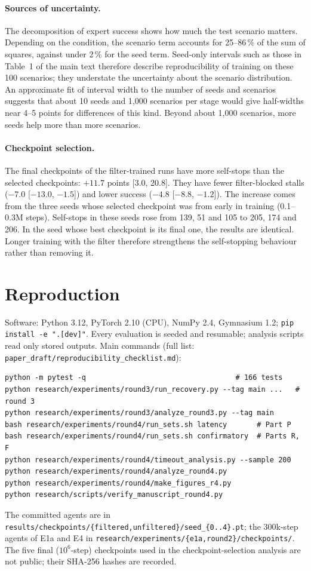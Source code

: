 \documentclass[11pt]{article}
\begin{document}
\paragraph{Sources of uncertainty.} The decomposition of expert success shows how much the test scenario matters. Depending on the condition, the scenario term accounts for 25--86\,\% of the sum of squares, against under 2\,\% for the seed term. Seed-only intervals such as those in Table~1 of the main text therefore describe reproducibility of training on these 100 scenarios; they understate the uncertainty about the scenario distribution. An approximate fit of interval width to the number of seeds and scenarios suggests that about 10 seeds and 1{,}000 scenarios per stage would give half-widths near 4--5 points for differences of this kind. Beyond about 1{,}000 scenarios, more seeds help more than more scenarios.

\paragraph{Checkpoint selection.} The final checkpoints of the filter-trained runs have more self-stops than the selected checkpoints: $+11.7$ points [3.0, 20.8]. They have fewer filter-blocked stalls ($-7.0$ [$-13.0$, $-1.5$]) and lower success ($-4.8$ [$-8.8$, $-1.2$]). The increase comes from the three seeds whose selected checkpoint was from early in training (0.1--0.3M steps). Self-stops in these seeds rose from 139, 51 and 105 to 205, 174 and 206. In the seed whose best checkpoint is its final one, the results are identical. Longer training with the filter therefore strengthens the self-stopping behaviour rather than removing it.

\section{Reproduction}
Software: Python 3.12, PyTorch 2.10 (CPU), NumPy 2.4, Gymnasium 1.2; \texttt{pip install -e ".[dev]"}. Every evaluation is seeded and resumable; analysis scripts read only stored outputs. Main commands (full list: \texttt{paper\_draft/reproducibility\_checklist.md}):
\begin{verbatim}
python -m pytest -q                                   # 166 tests
python research/experiments/round3/run_recovery.py --tag main ...   # round 3
python research/experiments/round3/analyze_round3.py --tag main
bash research/experiments/round4/run_sets.sh latency       # Part P
bash research/experiments/round4/run_sets.sh confirmatory  # Parts R, F
python research/experiments/round4/timeout_analysis.py --sample 200
python research/experiments/round4/analyze_round4.py
python research/experiments/round4/make_figures_r4.py
python research/scripts/verify_manuscript_round4.py
\end{verbatim}
The committed agents are in \texttt{results/checkpoints/\{filtered,unfiltered\}/seed\_\{0..4\}.pt}; the 300k-step agents of E1a and E4 in \texttt{research/experiments/\{e1a,round2\}/checkpoints/}. The five final ($10^6$-step) checkpoints used in the checkpoint-selection analysis are not public; their SHA-256 hashes are recorded.
\end{document}
